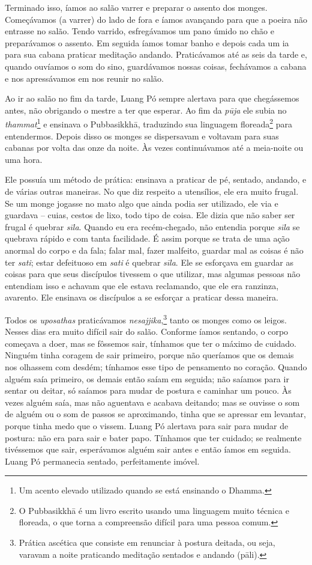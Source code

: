 Terminado isso, íamos ao salão varrer e preparar o assento dos monges.
Começávamos (a varrer) do lado de fora e íamos avançando para que a
poeira não entrasse no salão. Tendo varrido, esfregávamos um pano úmido
no chão e preparávamos o assento. Em seguida íamos tomar banho e depois
cada um ia para sua cabana praticar meditação andando. Praticávamos até
as seis da tarde e, quando ouvíamos o som do sino, guardávamos nossas
coisas, fechávamos a cabana e nos apressávamos em nos reunir no salão.

Ao ir ao salão no fim da tarde, Luang Pó sempre alertava para que
chegássemos antes, não obrigando o mestre a ter que esperar. Ao fim da
\emph{pūja} ele subia no \emph{thammat}\footnote{Um acento elevado
  utilizado quando se está ensinando o Dhamma.} e ensinava o
Pubbasikkhā, traduzindo sua linguagem floreada\footnote{O Pubbasikkhā é
  um livro escrito usando uma linguagem muito técnica e floreada, o que
  torna a compreensão difícil para uma pessoa comum.} para entendermos.
Depois disso os monges se dispersavam e voltavam para suas cabanas por
volta das onze da noite. Às vezes continuávamos até a meia-noite ou uma
hora.

Ele possuía um método de prática: ensinava a praticar de pé, sentado,
andando, e de várias outras maneiras. No que diz respeito a utensílios,
ele era muito frugal. Se um monge jogasse no mato algo que ainda podia
ser utilizado, ele via e guardava -- cuias, cestos de lixo, todo tipo de
coisa. Ele dizia que não saber ser frugal é quebrar \emph{sīla}. Quando
eu era recém-chegado, não entendia porque \emph{sīla} se quebrava rápido
e com tanta facilidade. É assim porque se trata de uma ação anormal do
corpo e da fala; falar mal, fazer malfeito, guardar mal as coisas é não
ter \emph{sati}; estar defeituoso em \emph{sati} é quebrar \emph{sīla}.
Ele se esforçava em guardar as coisas para que seus discípulos tivessem
o que utilizar, mas algumas pessoas não entendiam isso e achavam que ele
estava reclamando, que ele era ranzinza, avarento. Ele ensinava os
discípulos a se esforçar a praticar dessa maneira.

Todos os \emph{uposathas} praticávamos \emph{nesajjika},\footnote{Prática
  ascética que consiste em renunciar à postura deitada, ou seja, varavam
  a noite praticando meditação sentados e andando (pāli).} tanto
os monges como os leigos. Nesses dias era muito difícil sair do salão.
Conforme íamos sentando, o corpo começava a doer, mas se fôssemos sair,
tínhamos que ter o máximo de cuidado. Ninguém tinha coragem de sair
primeiro, porque não queríamos que os demais nos olhassem com desdém;
tínhamos esse tipo de pensamento no coração. Quando alguém saía
primeiro, os demais então saíam em seguida; não saíamos para ir sentar
ou deitar, só saíamos para mudar de postura e caminhar um pouco. Às
vezes alguém saía, mas não aguentava e acabava deitando; mas se ouvisse
o som de alguém ou o som de passos se aproximando, tinha que se apressar
em levantar, porque tinha medo que o vissem. Luang Pó alertava para sair
para mudar de postura: não era para sair e bater papo. Tínhamos que ter
cuidado; se realmente tivéssemos que sair, esperávamos alguém sair antes
e então íamos em seguida. Luang Pó permanecia sentado, perfeitamente
imóvel.

